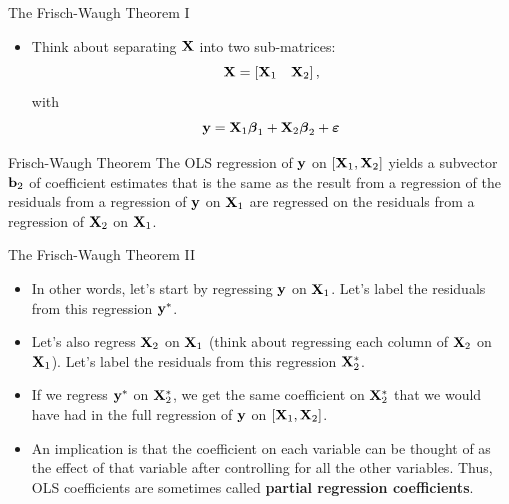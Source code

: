 \begin{frame}{The Frisch-Waugh Theorem I}
\begin{itemize}
	\item Think about separating $ {\bf X}$ into two sub-matrices:\[
	 {\bf X} =  \left[{\bf X}_{1}\quad  {\bf X}_2 \right],
	\]
	with \[
	{\bf y} = {\bf X}_{1} \boldsymbol{\beta}_{1} +  {\bf X}_{2} \boldsymbol{\beta}_{2} + \boldsymbol{\varepsilon}
	\]
\end{itemize}

\begin{block}{Frisch-Waugh Theorem}
The OLS regression of ${\bf y} $ on $\left[{\bf X}_{1},  {\bf X}_2 \right]$
yields a subvector ${\bf b}_{2}$ of coefficient estimates that is the same as
the result from a regression of the residuals from a regression
of ${\bf y} $ on ${\bf X}_{1}$ are regressed on the residuals
from a regression of ${\bf X}_{2}$ on ${\bf X}_{1}$.

\end{block}
\end{frame}

\begin{frame}{The Frisch-Waugh Theorem II}
\begin{itemize}
	\item In other words, let's start by regressing ${\bf y} $ on ${\bf X}_{1}$.
	Let's label the residuals from this regression ${\bf y}^{*} $.

	\item Let's also regress ${\bf X}_{2}$ on ${\bf X}_{1}$ 
	(think about regressing each column of ${\bf X}_{2}$ on ${\bf X}_{1}$).
	Let's label the residuals from this regression ${\bf X}^{*}_{2}$.

	\item If we regress ${\bf y}^{*}$ on ${\bf X}^{*}_{2}$, we get the same
	coefficient on ${\bf X}^{*}_{2}$ that we would have had in the full
	regression of  ${\bf y} $ on $\left[{\bf X}_{1},  {\bf X}_2 \right]$.

	\item An implication is that
	the coefficient on each variable can be thought of as the effect
	of that variable after controlling for all the other variables. Thus,
	OLS coefficients are sometimes called {\bf partial regression coefficients}.

\end{itemize}
\end{frame}



